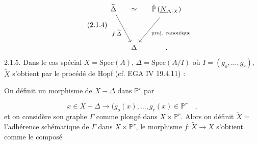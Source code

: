 \begin{equation}\tag{2.1.4}
\begin{tikzcd}[row sep=huge, column sep=small]
\widetilde{\Delta} \arrow[rd, "f|\widetilde{\Delta}"'] & \simeq & \check{\mathbb{P}}\,(\underline{N}_{\Delta|X}) \arrow[ld, "\text{proj. canonique}"] \\
{} & \Delta & .
\end{tikzcd}
\end{equation}
2.1.5. Dans le cas spécial $X = \mathrm{Spec}(A)$, $\Delta = \mathrm{Spec}(A/I)$ où $I = (g_o,\ldots,g_r)$, $\widetilde{X}$ s'obtient par le procédé de Hopf (cf. EGA IV 19.4.11) :

On définit un morphisme de $X - \Delta$ dans $\mathbb{P}^r$ par

\begin{equation*}
x \in X - \Delta \longrightarrow (g_o(x),\ldots,g_r(x) \in \mathbb{P}^r \quad ,
\end{equation*}
et on considère son graphe $\Gamma$ comme plongé dans $X \times \mathbb{P}^r$. Alors on définit $\widetilde{X} = $ l'adhérence schématique de $\Gamma$ dans $X \times \mathbb{P}^r$, le morphisme $f : \widetilde{X} \longrightarrow X$ s'obtient comme le composé

